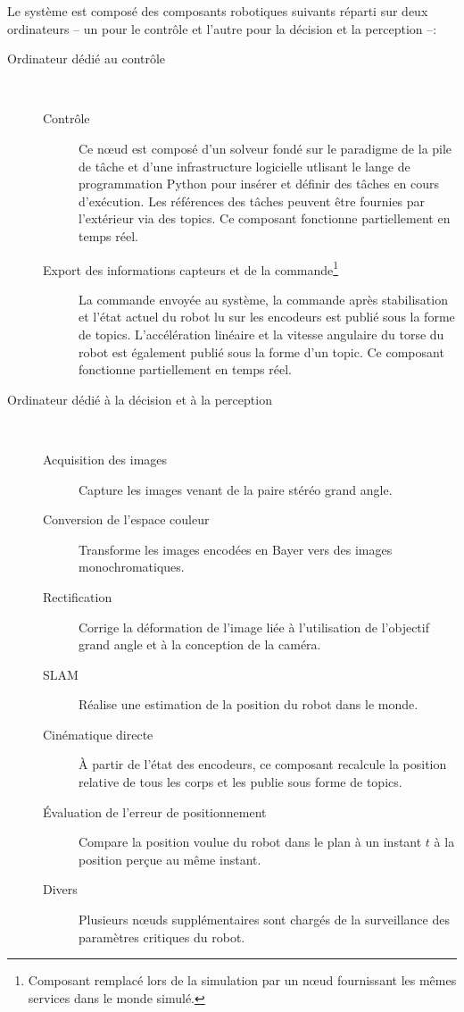 Le système est composé des composants robotiques suivants réparti sur
deux ordinateurs -- un pour le contrôle et l'autre pour la décision et
la perception --:
\begin{description}
\item[Ordinateur dédié au contrôle]
  ~\\
  \begin{description}
  \item[Contrôle] Ce n\oe ud est composé d'un solveur fondé sur le
    paradigme de la pile de tâche et d'une infrastructure logicielle
    utlisant le lange de programmation Python pour insérer et définir
    des tâches en cours d'exécution. Les références des tâches peuvent
    être fournies par l'extérieur via des topics. Ce composant fonctionne
    partiellement en temps réel.
  \item[Export des informations capteurs et de la
    commande\footnote{Composant remplacé lors de la simulation par un
      n\oe ud fournissant les mêmes services dans le monde
      simulé.}\addtocounter{footnote}{-1}\addtocounter{Hfootnote}{-1}]
    La commande envoyée au système, la commande après stabilisation et
    l'état actuel du robot lu sur les encodeurs est publié sous la
    forme de topics. L'accélération linéaire et la vitesse angulaire
    du torse du robot est également publié sous la forme d'un
    topic. Ce composant fonctionne partiellement en temps réel.
  \end{description}

\item[Ordinateur dédié à la décision et à la perception]
  ~\\
  \begin{description}
  \item[Acquisition des images\footnotemark] Capture les images venant de la paire
    stéréo grand angle.
  \item[Conversion de l'espace couleur] Transforme les images encodées
    en Bayer vers des images monochromatiques.
  \item[Rectification] Corrige la déformation de l'image liée à
    l'utilisation de l'objectif grand angle et à la conception de la
    caméra.
  \item[SLAM] Réalise une estimation de la position du robot dans le
    monde.
  \item[Cinématique directe] À partir de l'état des encodeurs, ce
    composant recalcule la position relative de tous les corps et les
    publie sous forme de topics.
  \item[Évaluation de l'erreur de positionnement] Compare la position
    voulue du robot dans le plan à un instant $t$ à la position perçue
    au même instant.
  \item[Divers] Plusieurs n\oe uds supplémentaires sont chargés de la
    surveillance des paramètres critiques du robot.
  \end{description}
\end{description}


